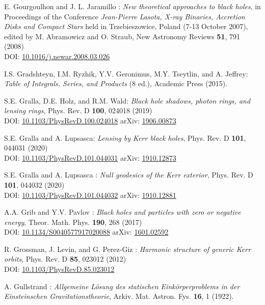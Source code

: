 \begin{thebibliography}{123}
E. Gourgoulhon and J. L. Jaramillo : {\em New theoretical approaches to black holes},
in Proceedings of the Conference {\em Jean-Pierre Lasota, X-ray Binaries, Accretion Disks and Compact Stars} held in Trzebieszowice, Poland (7-13 October 2007), edited by M. Abramowicz and O. Straub, New Astronomy Reviews {\bf 51}, 791 (2008) \\
DOI: \href{https://doi.org/10.1016/j.newar.2008.03.026}{10.1016/j.newar.2008.03.026}

I.S. Gradshteyn, I.M. Ryzhik, Y.V. Geronimus, M.Y. Tseytlin, and A. Jeffrey:
{\em  Table of Integrals, Series, and Products} (8 ed.),
Academic Press (2015).

S.E. Gralla, D.E. Holz, and R.M. Wald:
{\em Black hole shadows, photon rings, and lensing rings},
Phys. Rev. D {\bf 100}, 024018 (2019)\\
DOI: \href{https://doi.org/10.1103/PhysRevD.100.024018}{10.1103/PhysRevD.100.024018}\hfill
arXiv: \href{https://arxiv.org/abs/1906.00873}{1906.00873}

S.E. Gralla and A. Lupsasca:
{\em Lensing by Kerr black holes},
Phys. Rev. D {\bf 101}, 044031 (2020)\\
DOI: \href{https://doi.org/10.1103/PhysRevD.101.044031}{10.1103/PhysRevD.101.044031}\hfill
arXiv: \href{https://arxiv.org/abs/1910.12873}{1910.12873}

S.E. Gralla and A. Lupsasca :
{\em Null geodesics of the Kerr exterior},
Phys. Rev. D {\bf 101}, 044032 (2020)\\
DOI: \href{https://doi.org/10.1103/PhysRevD.101.044032}{10.1103/PhysRevD.101.044032}\hfill
arXiv: \href{https://arxiv.org/abs/1910.12881}{1910.12881}

A.A. Grib and Y.V. Pavlov :
{\em Black holes and particles with zero or negative energy},
Theor. Math. Phys. {\bf 190}, 268 (2017)\\
DOI: \href{https://doi.org/10.1134/S0040577917020088}{10.1134/S0040577917020088}\hfill
arXiv: \href{https://arxiv.org/abs/1601.02592}{1601.02592}

R. Grossman, J. Levin, and G. Perez-Giz :
{\em Harmonic structure of generic Kerr orbits},
Phys. Rev. D {\bf 85}, 023012 (2012)\\
DOI: \href{https://doi.org/10.1103/PhysRevD.85.023012}{10.1103/PhysRevD.85.023012}

A. Gullstrand :
\emph{Allgemeine Lösung des statischen Einkörperproblems in der Einsteinschen Gravitationstheorie},
Arkiv. Mat. Astron. Fys. {\bf 16}, 1 (1922).


\end{thebibliography}
